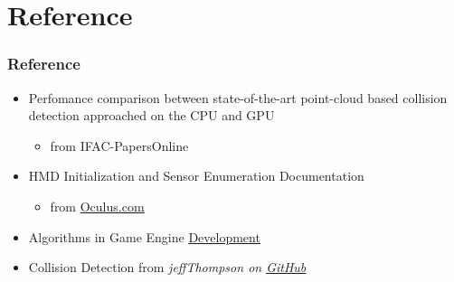 \documentclass{beamer}
\begin{document}
\section{Reference}

\begin{frame}
\frametitle{Reference}
\begin{itemize}
	\item Perfomance comparison between state-of-the-art point-cloud based collision detection approached on the CPU and GPU
		\begin{itemize}
			\item from IFAC-PapersOnline
		\end{itemize}
	\item HMD Initialization and Sensor Enumeration Documentation
		\begin{itemize}
			\item from \href{https://developer3.oculus.com/documentation/pcsdk/latest/concepts/dg-sensor/}{Oculus.com}
		\end{itemize}
	\item Algorithms in Game Engine \href{http://www.haroldserrano.com/blog/algorithms-in-game-engine-development}{Development}
	\item Collision Detection from \it{jeffThompson} on \href{https://github.com/jeffThompson/CollisionDetection}{GitHub}
\end{itemize}
\end{frame}
\end{document}
